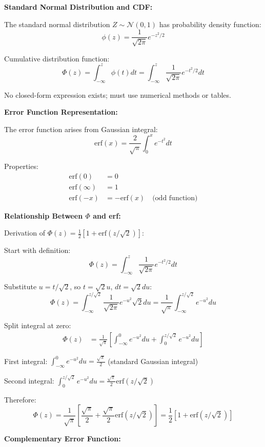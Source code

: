 \documentclass[12pt]{article}
\begin{document}
\begin{explanation}

\textbf{Standard Normal Distribution and CDF:}

The standard normal distribution $Z \sim \mathcal{N}(0,1)$ has probability density function:
\[
\phi(z) = \frac{1}{\sqrt{2\pi}}e^{-z^2/2}
\]

Cumulative distribution function:
\[
\Phi(z) = \int_{-\infty}^z \phi(t)dt = \int_{-\infty}^z \frac{1}{\sqrt{2\pi}}e^{-t^2/2}dt
\]

No closed-form expression exists; must use numerical methods or tables.

\textbf{Error Function Representation:}

The error function arises from Gaussian integral:
\[
\text{erf}(x) = \frac{2}{\sqrt{\pi}}\int_0^x e^{-t^2}dt
\]

Properties:
\begin{align*}
\text{erf}(0) &= 0 \\
\text{erf}(\infty) &= 1 \\
\text{erf}(-x) &= -\text{erf}(x) \quad \text{(odd function)}
\end{align*}

\textbf{Relationship Between $\Phi$ and erf:}

Derivation of $\Phi(z) = \frac{1}{2}[1 + \text{erf}(z/\sqrt{2})]$:

Start with definition:
\[
\Phi(z) = \int_{-\infty}^z \frac{1}{\sqrt{2\pi}}e^{-t^2/2}dt
\]

Substitute $u = t/\sqrt{2}$, so $t = \sqrt{2}u$, $dt = \sqrt{2}du$:
\[
\Phi(z) = \int_{-\infty}^{z/\sqrt{2}} \frac{1}{\sqrt{2\pi}}e^{-u^2}\sqrt{2}du = \frac{1}{\sqrt{\pi}}\int_{-\infty}^{z/\sqrt{2}} e^{-u^2}du
\]

Split integral at zero:
\begin{align*}
\Phi(z) &= \frac{1}{\sqrt{\pi}}\left[\int_{-\infty}^0 e^{-u^2}du + \int_0^{z/\sqrt{2}} e^{-u^2}du\right]
\end{align*}

First integral: $\int_{-\infty}^0 e^{-u^2}du = \frac{\sqrt{\pi}}{2}$ (standard Gaussian integral)

Second integral: $\int_0^{z/\sqrt{2}} e^{-u^2}du = \frac{\sqrt{\pi}}{2}\text{erf}(z/\sqrt{2})$

Therefore:
\[
\Phi(z) = \frac{1}{\sqrt{\pi}}\left[\frac{\sqrt{\pi}}{2} + \frac{\sqrt{\pi}}{2}\text{erf}(z/\sqrt{2})\right] = \frac{1}{2}\left[1 + \text{erf}(z/\sqrt{2})\right]
\]

\textbf{Complementary Error Function:}


\end{explanation}
\end{document}
